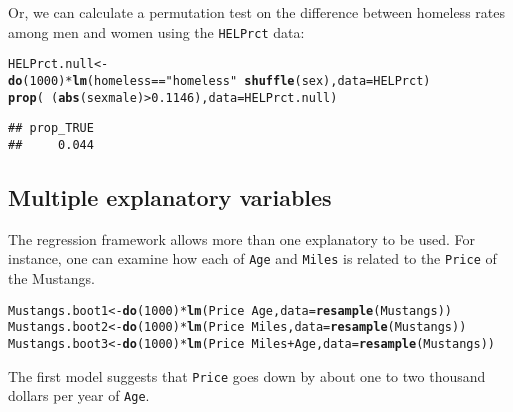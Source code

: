 \documentclass[11pt]{article}\usepackage[]{graphicx}\usepackage[]{color}
\makeatletter
\newcommand{\hlnum}[1]{\textcolor[rgb]{0.686,0.059,0.569}{#1}}%
\newcommand{\hlstr}[1]{\textcolor[rgb]{0.192,0.494,0.8}{#1}}%
\newcommand{\hlopt}[1]{\textcolor[rgb]{0,0,0}{#1}}%
\newcommand{\hlstd}[1]{\textcolor[rgb]{0.345,0.345,0.345}{#1}}%
\newcommand{\hlkwb}[1]{\textcolor[rgb]{0.69,0.353,0.396}{#1}}%
\newcommand{\hlkwc}[1]{\textcolor[rgb]{0.333,0.667,0.333}{#1}}%
\newcommand{\hlkwd}[1]{\textcolor[rgb]{0.737,0.353,0.396}{\textbf{#1}}}%
\newenvironment{kframe}{%
 \def\at@end@of@kframe{}%
 \ifinner\ifhmode%
  \def\at@end@of@kframe{\end{minipage}}%
  \begin{minipage}{\columnwidth}%
 \fi\fi%
 \def\FrameCommand##1{\hskip\@totalleftmargin \hskip-\fboxsep
 \colorbox{shadecolor}{##1}\hskip-\fboxsep
     \hskip-\linewidth \hskip-\@totalleftmargin \hskip\columnwidth}%
 \MakeFramed {\advance\hsize-\width
   \@totalleftmargin\z@ \linewidth\hsize
   \@setminipage}}%
 {\par\unskip\endMakeFramed%
 \at@end@of@kframe}
\newenvironment{knitrout}{}{} %
\makeatother
\begin{document}
Or, we can calculate a permutation test on the difference between homeless rates among men and women using the \texttt{HELPrct} data:

\begin{knitrout}
\color{fgcolor}\begin{kframe}
\begin{alltt}
\hlstd{HELPrct.null} \hlkwb{<-} \hlkwd{do}\hlstd{(}\hlnum{1000}\hlstd{)} \hlopt{*} \hlkwd{lm}\hlstd{(homeless}\hlopt{==}\hlstr{"homeless"} \hlopt{~} \hlkwd{shuffle}\hlstd{(sex),} \hlkwc{data} \hlstd{= HELPrct)}
\hlkwd{prop}\hlstd{(}\hlopt{~} \hlstd{(}\hlkwd{abs}\hlstd{(sexmale)} \hlopt{>} \hlnum{0.1146}\hlstd{),} \hlkwc{data} \hlstd{= HELPrct.null)}
\end{alltt}
\begin{verbatim}
## prop_TRUE 
##     0.044
\end{verbatim}
\end{kframe}
\end{knitrout}

\subsection{Multiple explanatory variables}

The regression framework allows more than one explanatory to be used.  For instance, one can examine how each of \texttt{Age} and \texttt{Miles} is related to the \texttt{Price} of the Mustangs.

\begin{knitrout}
\color{fgcolor}\begin{kframe}
\begin{alltt}
\hlstd{Mustangs.boot1} \hlkwb{<-} \hlkwd{do}\hlstd{(}\hlnum{1000}\hlstd{)} \hlopt{*} \hlkwd{lm}\hlstd{(Price} \hlopt{~} \hlstd{Age,} \hlkwc{data} \hlstd{=} \hlkwd{resample}\hlstd{(Mustangs))}
\hlstd{Mustangs.boot2} \hlkwb{<-} \hlkwd{do}\hlstd{(}\hlnum{1000}\hlstd{)} \hlopt{*} \hlkwd{lm}\hlstd{(Price} \hlopt{~} \hlstd{Miles,} \hlkwc{data} \hlstd{=} \hlkwd{resample}\hlstd{(Mustangs))}
\hlstd{Mustangs.boot3} \hlkwb{<-} \hlkwd{do}\hlstd{(}\hlnum{1000}\hlstd{)} \hlopt{*} \hlkwd{lm}\hlstd{(Price} \hlopt{~} \hlstd{Miles} \hlopt{+} \hlstd{Age,} \hlkwc{data} \hlstd{=} \hlkwd{resample}\hlstd{(Mustangs))}
\end{alltt}
\end{kframe}
\end{knitrout}
The first model suggests that \texttt{Price} goes down by about one to two thousand dollars per year of \texttt{Age}. 
\end{document}
